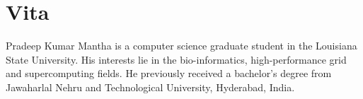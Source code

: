 \documentclass[12pt]{report}
\begin{document}
\normalsize




\chapter*{Vita}
Pradeep Kumar Mantha is a computer science graduate student in the Louisiana State University. 
His interests lie in the bio-informatics, high-performance grid and supercomputing fields. 
He previously received a bachelor's degree from Jawaharlal Nehru and Technological University, Hyderabad, India.
\end{document}
